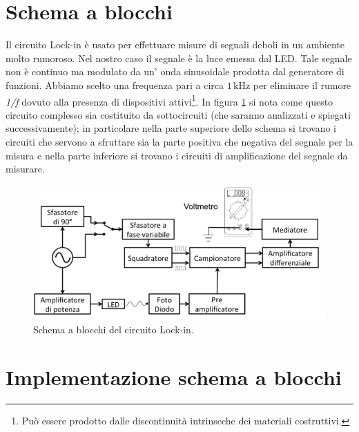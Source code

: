 \documentclass[10pt,a4paper]{article}
\begin{document}
\section{Schema a blocchi}
Il circuito Lock-in è usato per effettuare misure di segnali deboli in un ambiente molto rumoroso. Nel nostro caso il segnale è la luce emessa dal LED. Tale segnale non è continuo ma modulato da un' onda sinusoidale prodotta dal generatore di funzioni. Abbiamo scelto una frequenza pari a circa $1\,\mbox{kHz}$ per eliminare il rumore \emph{1/f} dovuto alla presenza di dispositivi attivi\footnote{Può essere prodotto dalle discontinuità intrinseche dei materiali costruttivi.}. In figura \ref{fig:schemablocchi} si nota come questo circuito complesso sia costituito da sottocircuiti (che saranno analizzati e spiegati successivamente); in particolare nella parte superiore dello schema si trovano i circuiti che servono a sfruttare sia la parte positiva che negativa del segnale per la misura e nella parte inferiore si trovano i circuiti di amplificazione del segnale da misurare.

\begin{figure}[!htb]
  \centering
  \includegraphics[scale=0.75]{schemablocchi.png}
\caption{Schema a blocchi del circuito Lock-in.\label{fig:schemablocchi}}
\end{figure}


\section{Implementazione schema a blocchi}
\end{document}
